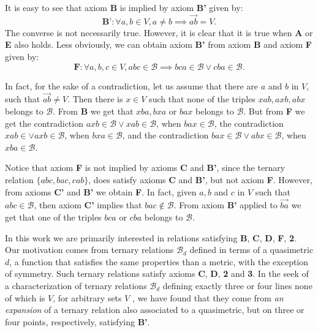 \documentclass{article}
\newcommand{\calb}{\mathcal{B}}
\begin{document}
It is easy to see that axiom \textbf{B} is implied by axiom \textbf{B'} given by:
$$\textbf{B'}:\forall a,b\in V, a\neq  b\implies\overrightarrow{ab}=V.$$
The converse is not necessarily true. However, it is clear that it is true when \textbf{A} or \textbf{E} also holds. Less obviously, we can obtain axiom \textbf{B'} from axiom \textbf{B} and axiom \textbf{F} given by:
$$\textbf{F}: \forall a,b,c\in V, abc\in\calb\implies bca \in\calb\lor cba \in\calb.$$

In fact, for the sake of a contradiction, let us assume that there are $a$ and $b$ in $V$, such that $\overrightarrow{ab}\neq V$. Then there is $x\in V$ such that none of the triples $xab,axb,abx$ belongs to $\calb$. From \textbf{B} we get that $xba,bxa$ or $bax$ belongs to $\calb$.  But from \textbf{F} we get the contradiction
$axb\in\calb\lor xab\in\calb$, when $bax\in\calb$,
the contradiction
$xab\in \lor axb\in\calb$, when $bxa\in\calb$, and the contradiction
$bax\in\calb\lor abx\in\calb$, when $xba\in\calb$. 

Notice that axiom \textbf{F} is not implied by axioms \textbf{C} and \textbf{B'}, since the ternary relation 
$\{abc,bac,cab\}$, does satisfy axioms \textbf{C} and \textbf{B'}, but not axiom \textbf{F}. However, from axioms
\textbf{C'} and  \textbf{B'} we obtain \textbf{F}. In fact, given $a,b$ and $c$ in $V$ such that $abc\in\calb$, then axiom \textbf{C'} implies that $bac\notin\calb$. From axiom \textbf{B'} applied to $\overrightarrow{ba}$ we get that one of the triples $bca$ or $cba$ belongs to $\calb$. 

In this work we are primarily interested in relations satisfying \textbf{B}, \textbf{C}, \textbf{D}, \textbf{F}, \textbf{2}. Our motivation comes from ternary relations  $\calb_d$ defined in terms of a quasimetric $d$, a function that satisfies the same properties than a metric, with the exception of symmetry. Such ternary relations satisfy axioms \textbf{C}, \textbf{D}, \textbf{2} and \textbf{3}. In the seek of a characterization of ternary relations  $\calb_d$ defining exactly three or four lines none of which is $V$, for arbitrary sets $V$  \cite{gamaza2024}, we have found that they come from \emph{an expansion} of a ternary relation also associated to a quasimetric, but on three or four points, respectively, satisfying \textbf{B'}.
\end{document}
